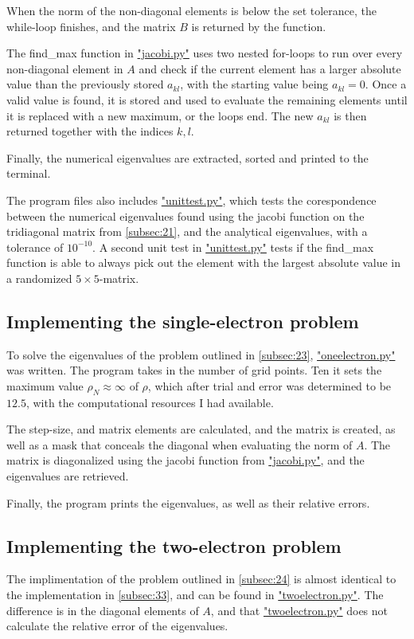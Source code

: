 \documentclass[english,notitlepage,reprint]{revtex4-1}  %
\begin{document}
When the norm of the non-diagonal elements is below the set tolerance, the while-loop finishes, and the matrix \(B\) is returned by the function.

The find\_max function in \hyperref[A:2]{"jacobi.py"} uses two nested for-loops to run over every non-diagonal element in \(A\) and check if the current element has a larger absolute value than the previously stored \(a_{kl}\), with the starting value being \(a_{kl} = 0\). Once a valid value is found, it is stored and used to evaluate the remaining elements until it is replaced with a new maximum, or the loops end. The new \(a_{kl}\) is then returned together with the indices \(k,l\).

Finally, the numerical eigenvalues are extracted, sorted and printed to the terminal.

The program files also includes \hyperref[A:5]{"unittest.py"}, which tests the corespondence between the numerical eigenvalues found using the jacobi function on the tridiagonal matrix from \autoref{subsec:21}, and the analytical eigenvalues, with a tolerance of \(10^{-10}\). A second unit test in \hyperref[A:5]{"unittest.py"} tests if the find\_max function is able to always pick out the element with the largest absolute value in a randomized \(5\times5\)-matrix.

\subsection{Implementing the single-electron problem}\label{subsec:33}
To solve the eigenvalues of the problem outlined in \autoref{subsec:23}, \hyperref[A:3]{"oneelectron.py"} was written. The program takes in the number of grid points. Ten it sets the maximum value \(\rho_{N}\approx\infty\) of \(\rho\), which after trial and error was determined to be \(12.5\), with the computational resources I had available.

The step-size, and matrix elements are calculated, and the matrix is created, as well as a mask that conceals the diagonal when evaluating the norm of \(A\). The matrix is diagonalized using the jacobi function from \hyperref[A:2]{"jacobi.py"}, and the eigenvalues are retrieved.

Finally, the program prints the eigenvalues, as well as their relative errors.

\subsection{Implementing the two-electron problem}\label{subsec:34}
The implimentation of the problem outlined in \autoref{subsec:24} is almost identical to the implementation in \autoref{subsec:33}, and can be found in \hyperref[A:4]{"twoelectron.py"}. The difference is in the diagonal elements of \(A\), and that \hyperref[A:4]{"twoelectron.py"} does not calculate the relative error of the eigenvalues.
\end{document}

